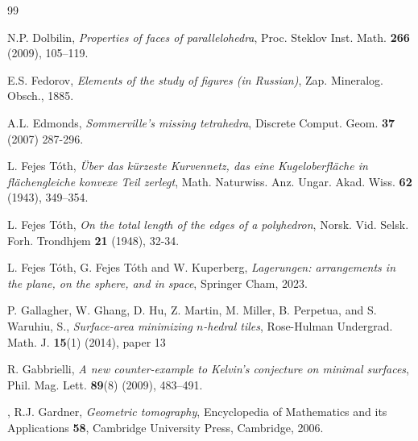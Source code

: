 \documentclass[twoside]{amsart}
\theoremstyle{definition}
\begin{document}
\begin{thebibliography}{99}


 N.P. Dolbilin, \emph{Properties of faces of parallelohedra}, Proc. Steklov Inst. Math. \textbf{266} (2009), 105–119.

 E.S. Fedorov, \emph{Elements of the study of figures (in Russian)}, Zap. Mineralog. Obsch., 1885.

 A.L. Edmonds, \emph{Sommerville's missing tetrahedra}, Discrete Comput. Geom. \textbf{37} (2007) 287-296.
                
 L. Fejes T\'oth, \emph{\"Uber das k\"urzeste Kurvennetz, das eine Kugeloberfl\"ache in fl\"achengleiche konvexe Teil zerlegt}, Math. Naturwiss. Anz. Ungar. Akad. Wiss. \textbf{62} (1943), 349–354.


 L. Fejes T\'oth, \emph{On the total length of the edges of a polyhedron}, Norsk. Vid. Selsk. Forh. Trondhjem \textbf{21} (1948), 32-34.

 L. Fejes T\'oth, G. Fejes T\'oth and W. Kuperberg, \emph{ Lagerungen: arrangements in the plane, on the sphere, and in space}, Springer Cham, 2023.

 P. Gallagher, W. Ghang, D. Hu, Z. Martin, M. Miller, B. Perpetua, and S. Waruhiu, S., \emph{Surface-area minimizing $n$-hedral tiles}, Rose-Hulman Undergrad. Math. J. \textbf{15}(1) (2014), paper 13

 R. Gabbrielli, \emph{A new counter-example to Kelvin's conjecture on minimal surfaces}, Phil. Mag. Lett. \textbf{89}(8) (2009), 483–491. 


, R.J. Gardner, \emph{Geometric tomography}, Encyclopedia of Mathematics and its Applications \textbf{58}, Cambridge University Press, Cambridge, 2006.


\end{thebibliography}
\end{document}
